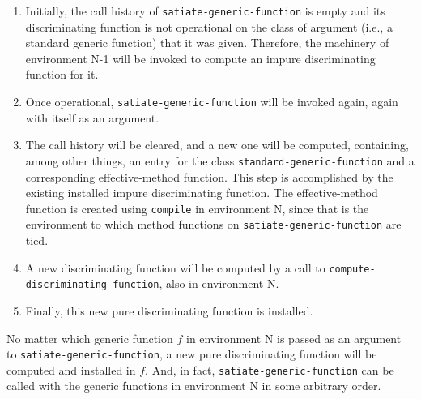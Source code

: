\begin{enumerate}
\item Initially, the call history of \texttt{satiate-generic-function}
  is empty and its discriminating function is not operational on the
  class of argument (i.e., a standard generic function) that it was
  given.  Therefore, the machinery of environment N-1 will be invoked
  to compute an impure discriminating function for it.
\item Once operational, \texttt{satiate-generic-function} will be
  invoked again, again with itself as an argument.
\item The call history will be cleared, and a new one will be
  computed, containing, among other things, an entry for the class
  \texttt{standard-generic-function} and a corresponding
  effective-method function.  This step is accomplished by the
  existing installed impure discriminating function.  The
  effective-method function is created using \texttt{compile} in
  environment N, since that is the environment to which method
  functions on \texttt{satiate-generic-function} are tied.
\item A new discriminating function will be computed by a call to
  \texttt{compute-discriminating-function}, also in environment N.
\item Finally, this new pure discriminating function is installed.
\end{enumerate}

No matter which generic function $f$ in environment N is passed as an
argument to \texttt{satiate-generic-function}, a new pure
discriminating function will be computed and installed in $f$.  And,
in fact, \texttt{satiate-generic-function} can be called with the
generic functions in environment N in some arbitrary order.
